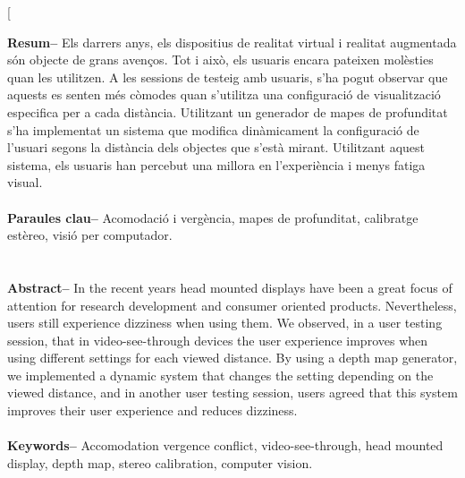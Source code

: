 \documentclass[10pt,a4paper,twocolumn,twoside]{article}
\begin{document}
	\twocolumn[\begin{@twocolumnfalse}
	
	
	\maketitle
	
	\thispagestyle{primerapagina}
	\begin{center}
	\parbox{0.915\textwidth}
	{\sffamily
	\textbf{Resum--}
	Els darrers anys, els dispositius de realitat virtual i realitat augmentada són objecte de grans avenços. Tot i això, els usuaris encara pateixen molèsties quan les utilitzen. A les sessions de testeig amb usuaris, s'ha pogut observar que aquests es senten més còmodes quan s'utilitza una configuració de visualització especifica per a cada distància. Utilitzant un generador de mapes de profunditat s'ha implementat un sistema que modifica dinàmicament la configuració de l'usuari segons la distància dels objectes que s'està mirant. Utilitzant aquest sistema, els usuaris han percebut una millora en l'experiència i menys fatiga visual.
	\\
	\\
	\textbf{Paraules clau-- } Acomodació i vergència, mapes de profunditat, calibratge estèreo, visió per computador.\\
	\\
	\bigskip
	\\
	\textbf{Abstract--} In the recent years head mounted displays have been a great focus of attention for research development and consumer oriented products. Nevertheless, users still experience dizziness when using them. We observed, in a user testing session, that in video-see-through devices the user experience improves when using different settings for each viewed distance. By using a depth map generator, we implemented a dynamic system that changes the setting depending on the viewed distance, and in another user testing session, users agreed that this system improves their user experience and reduces dizziness. 
	\\
	\\
	\textbf{Keywords-- } Accomodation vergence conflict, video-see-through, head mounted display, depth map, stereo calibration,  computer vision. 
	}
	

\end{center}
\end{@twocolumnfalse}
\end{document}

